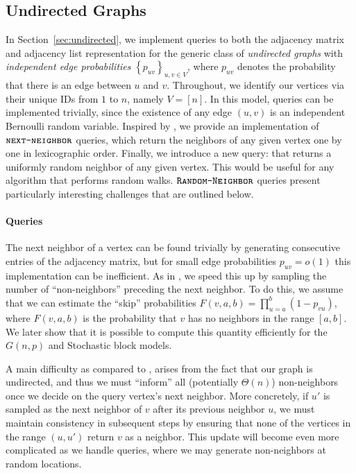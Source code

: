 \subsection{Undirected Graphs}
\label{sec:undirected_graphs}
In Section~\ref{sec:undirected}, we implement queries to both the adjacency matrix and adjacency list representation
for the generic class of \emph{undirected graphs} with {\em independent edge probabilities} $\left\{ p_{uv} \right\}_{u,v\in V}$,
where $p_{uv}$ denotes the probability that there is an edge between $u$ and $v$.
Throughout, we identify our vertices via their unique IDs from $1$ to $n$, namely $V = [n]$.
In this model,  queries can be implemented trivially,
since the existence of any edge $(u,v)$ is an independent Bernoulli random variable.
Inspired by \cite{reut}, we provide an implementation of $\texttt{\textsc{next-neighbor}}$ queries,
which return the neighbors of any given vertex one by one in lexicographic order.
Finally, we introduce a new query:  that returns a uniformly random neighbor of any given vertex.
This would be useful for any algorithm that performs random walks.
$\texttt{\textsc{Random-Neighbor}}$ queries present particularly interesting challenges that are outlined below.

\paragraph*{ Queries}
\label{par:next_neighbor_queries}
The next neighbor of a vertex can be found trivially by generating consecutive entries of the adjacency matrix,
but for small edge probabilities $p_{uv} = o(1)$ this implementation can be inefficient.
As in \cite{reut}, we speed this up by sampling the number of ``non-neighbors'' preceding the next neighbor.
To do this, we assume that we can estimate the ``skip'' probabilities $F(v,a,b)=\prod^{b}_{u=a} (1-p_{vu})$,
where $F(v,a,b)$ is the probability that $v$ has no neighbors in the range $[a,b]$.
We later show that it is possible to compute this quantity efficiently for the $G(n,p)$ and Stochastic block models.

A main difficulty as compared to \cite{reut}, arises from the fact that our graph is undirected,
and thus we must ``inform'' all (potentially $\Theta(n)$) non-neighbors once we decide on the query vertex's next neighbor.
More concretely, if $u'$ is sampled as the next neighbor of $v$ after its previous neighbor $u$,
we must maintain consistency in subsequent steps by ensuring that none of the vertices in the range $(u,u')$ return $v$ as a neighbor.
This update will become even more complicated as we handle  queries, where we may generate non-neighbors at random locations.

